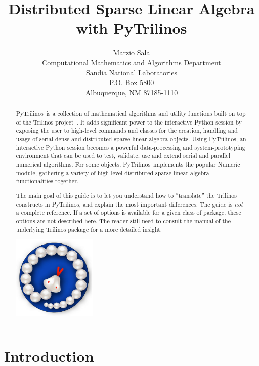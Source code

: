 \documentclass[10pt,relax]{SANDreport}
\author{Marzio Sala\\
Computational Mathematics and Algorithms Department \\
Sandia National Laboratories \\
P.O. Box 5800 \\
Albuquerque, NM 87185-1110
}
\title{Distributed Sparse Linear Algebra with PyTrilinos}
\newcommand{\PyTrilinos}{{PyTrilinos}}
\begin{document}
\maketitle

\begin{abstract}

\PyTrilinos\ is a collection of mathematical algorithms and utility functions
built on top of the Trilinos project~\cite{Trilinos-home-page}.  It adds
significant power to the interactive Python session by exposing the user to
high-level commands and classes for the creation, handling and usage of serial
dense and distributed sparse linear algebra objects. Using \PyTrilinos, an
interactive Python session becomes a powerful data-processing and
system-prototyping environment that can be used to test, validate, use and
extend serial and parallel numerical algorithms.
For some objects, \PyTrilinos\ implements
the popular Numeric module, gathering a variety of high-level distributed
sparse linear algebra functionalities together.

The main goal of this guide is to let you understand how to ``translate'' the
Trilinos constructs in PyTrilinos, and explain the most important differences.
The guide is {\sl not} a complete reference. If a set of options is available
for a given class of package, these options are not described here. The reader
still need to consult the manual of the underlying Trilinos package for a more
detailed insight.

\bigskip

\begin{center}
\includegraphics[height=4cm]{PyTrilinos.eps}
\end{center}

\end{abstract}

\SANDmain

\tableofcontents
\newpage

\section{Introduction}
\label{chap:introduction}
\end{document}
